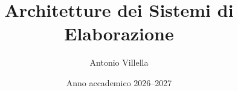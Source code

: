 \title{Architetture dei Sistemi di Elaborazione}
\author{Antonio Villella}
\date{Anno accademico 2026--2027}

\maketitle
